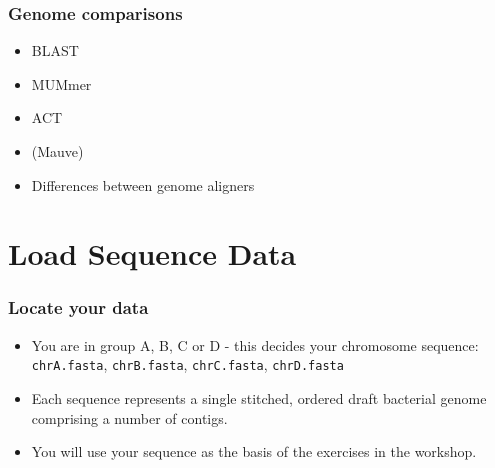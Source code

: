 \documentclass[table]{beamer}
\begin{document}
    \begin{frame}
     \frametitle{Genome comparisons}
     \begin{itemize}
       \item BLAST
       \item MUMmer
       \item ACT
       \item (Mauve)
       \item Differences between genome aligners
     \end{itemize}
    \end{frame}

%    


  \section{Load Sequence Data}
  \begin{frame}
    \frametitle{Locate your data}
    \begin{itemize}
      \item You are in group A, B, C or D - this decides your chromosome sequence: \\
      \texttt{chrA.fasta}, \texttt{chrB.fasta}, \texttt{chrC.fasta}, \texttt{chrD.fasta}
      \item Each sequence represents a single stitched, ordered draft bacterial genome comprising a number of contigs.
      \item You will use your sequence as the basis of the exercises in the workshop.
    \end{itemize}
  \end{frame}
  
\end{document}
